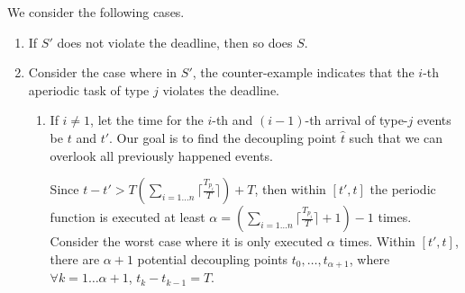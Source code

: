 \documentclass[10pt, a4paper, onecolumn, conference, compsocconf]{IEEEtran}
\begin{document}
\begin{IEEEproof} We consider the following cases.
\begin{enumerate}
    \item If $S'$ does not violate the deadline, then so does $S$.
    \item Consider the case where in $S'$, the counter-example indicates that the $i$-th aperiodic task of type
          $j$ violates the deadline.
    \begin{enumerate}
          \item If $i \neq 1$, let the time for the $i$-th and $(i-1)$-th arrival of type-$j$ events be $t$
          and $t'$. Our goal is to find the decoupling point $\hat{t}$ such that we can overlook
          all previously happened events.

          Since $t-t'>T(\sum_{i= 1 \ldots n}\lceil\frac{ T_{p_i}}{T}\rceil) + T$,
          then within $[t',t]$ the periodic function is executed at least $\alpha=(\sum_{i= 1 \ldots n}\lceil\frac{ T_{p_i}}{T}\rceil + 1)-1$
          times. Consider the worst case where it is only executed
          $\alpha$ times. Within $[t',t]$, there are $\alpha+1$ potential decoupling points $t_{0},\ldots, t_{\alpha+1}$, where $\forall k=1\ldots \alpha+1$, $t_{k}-t_{k-1}=T$.


\end{enumerate}
\end{enumerate}
\end{IEEEproof}
\end{document}
